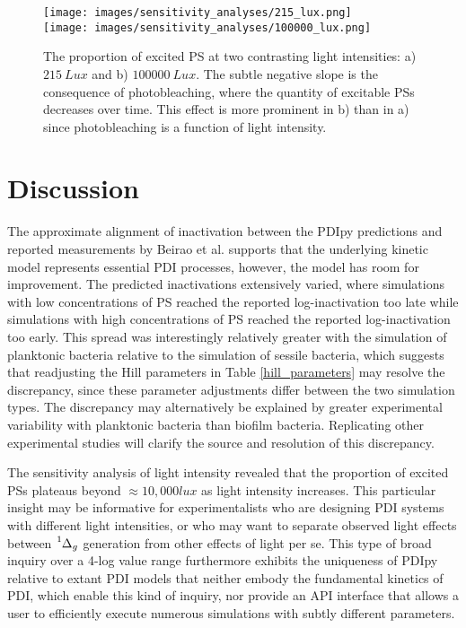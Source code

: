 \begin{figure}
    \centering
    \texttt{[image: images/sensitivity\_analyses/215\_lux.png]} \\
    \vspace{5mm}
    \midrule
    \vspace{5mm}
    \texttt{[image: images/sensitivity\_analyses/100000\_lux.png]}
    \caption{
        The proportion of excited PS at two contrasting light intensities: a) $215~Lux$ and b) $100000~Lux$. The subtle negative slope is the consequence of photobleaching, where the quantity of excitable PSs decreases over time. This effect is more prominent in b) than in a) since photobleaching is a function of light intensity.
    }
    \label{light_intensities}
\end{figure}

\section{Discussion}
The approximate alignment of inactivation between the PDIpy predictions and reported measurements by Beirao et al. supports that the underlying kinetic model represents essential PDI processes, however, the model has room for improvement. The predicted inactivations extensively varied, where simulations with low concentrations of PS reached the reported log-inactivation too late while simulations with high concentrations of PS reached the reported log-inactivation too early. This spread was interestingly relatively greater with the simulation of planktonic bacteria relative to the simulation of sessile bacteria, which suggests that readjusting the Hill parameters in Table \ref{hill_parameters} may resolve the discrepancy, since these parameter adjustments differ between the two simulation types. The discrepancy may alternatively be explained by greater experimental variability with planktonic bacteria than biofilm bacteria. Replicating other experimental studies will clarify the source and resolution of this discrepancy. 

The sensitivity analysis of light intensity revealed that the proportion of excited PSs plateaus beyond $\approx 10,000 lux$ as light intensity increases. This particular insight may be informative for experimentalists who are designing PDI systems with different light intensities, or who may want to separate observed light effects between $\ce{^1\Delta_g}$ generation from other effects of light per se. This type of broad inquiry over a 4-log value range furthermore exhibits the uniqueness of PDIpy relative to extant PDI models that neither embody the fundamental kinetics of PDI, which enable this kind of inquiry, nor provide an API interface that allows a user to efficiently execute numerous simulations with subtly different parameters.  

